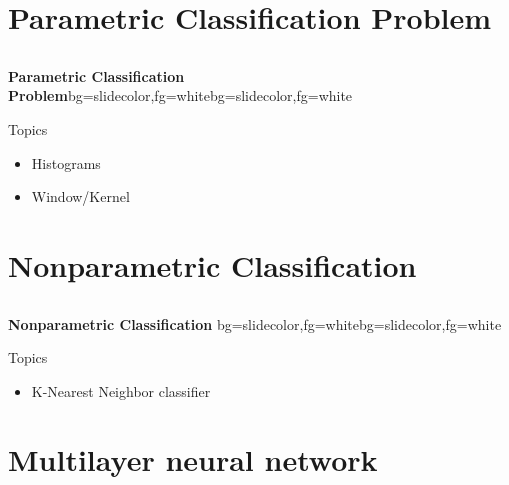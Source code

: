 \section{Parametric Classification Problem}
\subsection{}
\begin{frame}{}
\begin{variableblock}{\centering \Large \textbf{\vspace{4pt}\newline Parametric Classification Problem\vspace{4pt}}}{bg=slidecolor,fg=white}{bg=slidecolor,fg=white}
\end{variableblock}
\end{frame}

\begin{frame}{Topics}
\begin{itemize}
\item Histograms
\item Window/Kernel
\end{itemize}
\end{frame}

\section{Nonparametric Classification}
\subsection{}
\begin{frame}{}
\begin{variableblock}{\centering \Large \textbf{\vspace{4pt}\newline Nonparametric Classification \vspace{4pt}}}{bg=slidecolor,fg=white}{bg=slidecolor,fg=white}
\end{variableblock}
\end{frame}

\begin{frame}{Topics}
\begin{itemize}
\item K-Nearest Neighbor classifier
\end{itemize}
\end{frame}

\section{Multilayer neural network}

